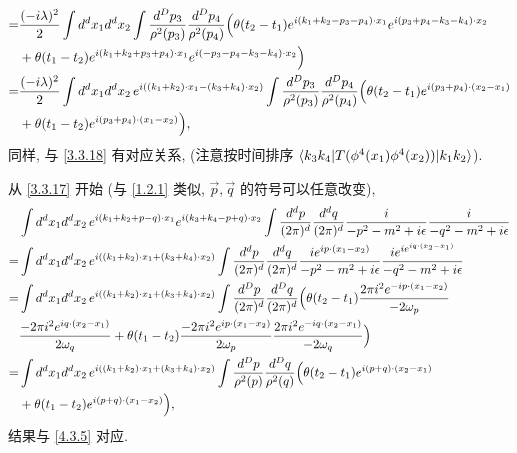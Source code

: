 \begin{itemize}
\begin{align}
		=& \frac{(- i \lambda)^2}{2} \int d^d x_1 d^d x_2 \int \frac{d^D p_3}{\rho^2(p_3)} \frac{d^D p_4}{\rho^2(p_4)} \Big( \theta(t_2 - t_1) e^{i (k_1 + k_2 - p_3 - p_4) \cdot x_1} e^{i (p_3 + p_4 - k_3 - k_4) \cdot x_2} \notag \\
		& + \theta(t_1 - t_2) e^{i (k_1 + k_2 + p_3 + p_4) \cdot x_1} e^{i (- p_3 - p_4 - k_3 - k_4) \cdot x_2} \Big) \notag \\
		=& \frac{(- i \lambda)^2}{2} \int d^d x_1 d^d x_2 \, e^{i ((k_1 + k_2) \cdot x_1 - (k_3 + k_4) \cdot x_2)} \int \frac{d^D p_3}{\rho^2(p_3)} \frac{d^D p_4}{\rho^2(p_4)} \Big( \theta(t_2 - t_1) e^{i (p_3 + p_4) \cdot (x_2 - x_1)} \notag \\
		& + \theta(t_1 - t_2) e^{i (p_3 + p_4) \cdot (x_1 - x_2)} \Big), \label{4.3.5}
	\end{align}
	同样, 与 \eqref{3.3.18} 有对应关系, (注意按时间排序 $\braket{k_3 k_4 | T(\phi^4(x_1) \phi^4(x_2)) | k_1 k_2}$).
	
	\begin{tcolorbox}[title=calculation:]
		从 \eqref{3.3.17} 开始 (与 \eqref{1.2.1} 类似, $\vec{p}, \vec{q}$ 的符号可以任意改变),
		\begin{align}
			& \int d^d x_1 d^d x_2 \, e^{i (k_1 + k_2 + p - q) \cdot x_1} e^{i (k_3 + k_4 - p + q) \cdot x_2} \int \frac{d^d p}{(2 \pi)^d} \frac{d^d q}{(2 \pi)^d} \frac{i}{- p^2 - m^2 + i \epsilon} \frac{i}{- q^2 - m^2 + i \epsilon} \notag \\
			=& \int d^d x_1 d^d x_2 \, e^{i ((k_1 + k_2) \cdot x_1 + (k_3 + k_4) \cdot x_2)} \int \frac{d^d p}{(2 \pi)^d} \frac{d^d q}{(2 \pi)^d} \frac{i e^{i p \cdot (x_1 - x_2)}}{- p^2 - m^2 + i \epsilon} \frac{i e^{i e^{i q \cdot (x_2 - x_1)}}}{- q^2 - m^2 + i \epsilon} \notag \\
			=& \int d^d x_1 d^d x_2 \, e^{i ((k_1 + k_2) \cdot x_1 + (k_3 + k_4) \cdot x_2)} \int \frac{d^D p}{(2 \pi)^d} \frac{d^D q}{(2 \pi)^d} \Big( \theta(t_2 - t_1) \frac{2 \pi i^2 e^{- i p \cdot (x_1 - x_2)}}{- 2 \omega_p} \notag \\
			& \frac{- 2 \pi i^2 e^{i q \cdot (x_2 - x_1)}}{2 \omega_q} + \theta(t_1 - t_2) \frac{- 2 \pi i^2 e^{i p \cdot (x_1 - x_2)}}{2 \omega_p} \frac{2 \pi i^2 e^{- i q \cdot (x_2 - x_1)}}{- 2 \omega_q} \Big) \notag \\
			=& \int d^d x_1 d^d x_2 \, e^{i ((k_1 + k_2) \cdot x_1 + (k_3 + k_4) \cdot x_2)} \int \frac{d^D p}{\rho^2(p)} \frac{d^D q}{\rho^2(q)} \Big( \theta(t_2 - t_1) e^{i (p + q) \cdot (x_2 - x_1)} \notag \\
			& + \theta(t_1 - t_2) e^{i (p + q) \cdot (x_1 - x_2)} \Big),
		\end{align}
		结果与 \eqref{4.3.5} 对应.
	\end{tcolorbox}
\end{itemize}

